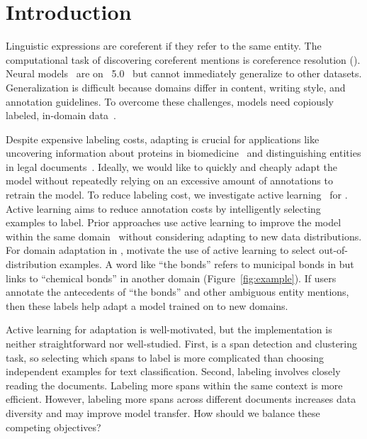 \section{Introduction}
\label{sec:intro}

Linguistic expressions are coreferent if they refer to the same
entity.
The computational task of discovering coreferent mentions is coreference
resolution (\coref).
Neural models~\citep{lee-2018,joshi-2020} are 
on \ontonotes~{\small 5.0}~\citep{pradhan-2013} but
cannot immediately generalize to other datasets.
Generalization is difficult because domains differ in content, writing style, and annotation
guidelines.
To overcome these challenges, models need copiously labeled,
in-domain data~\citep{bamman-2020}.

Despite expensive labeling costs, adapting \coref{} is crucial for applications like
uncovering information about proteins in biomedicine~\citep{kim-2012}
and distinguishing entities in legal documents~\citep{gupta-2018}.
Ideally, we would like to quickly and cheaply adapt the model without repeatedly relying on an excessive amount of annotations to retrain the model.
To reduce labeling cost, we investigate active learning~\citep{settles-2009}
for \coref{}.  Active learning aims to reduce annotation costs by
intelligently selecting examples to label.
Prior approaches use active learning to improve the model within the same domain~\citep{gasperin-2009,sachan-2015} without considering adapting to new data distributions.
For domain adaptation in \coref{},
\citet{zhao-2014} motivate the use of active learning
to select out-of-distribution examples.
A word like ``the bonds'' refers to municipal bonds in
\ontonotes{} but links to ``chemical bonds'' in another
domain (Figure~\ref{fig:example}).
If users annotate the antecedents of ``the
bonds'' and other ambiguous entity mentions, then these labels
help adapt a model trained on \ontonotes{} to new domains.

Active learning for \coref{} adaptation is well-motivated, but the implementation is neither straightforward nor well-studied.
First, \coref{} is a span detection and clustering task,
so selecting which spans to label is more complicated than
choosing independent examples for text classification.
Second, \coref{} labeling involves closely reading the
documents.
Labeling more spans within the same context is more efficient.  However, labeling more spans across different documents increases data diversity and may
improve model transfer.
How should we balance these competing objectives?

